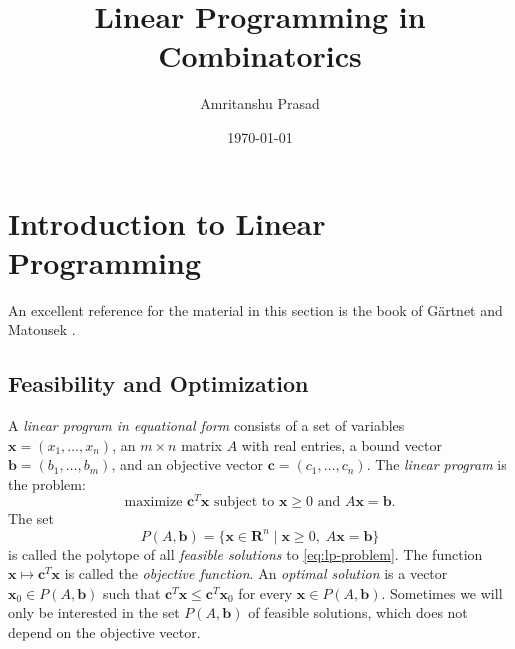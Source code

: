 \documentclass{amsbook}
\newcommand{\xx}{\mathbf x}
\newcommand{\cc}{\mathbf c}
\newcommand{\bb}{\mathbf b}
\newcommand{\RR}{\mathbf R}
\theoremstyle{definition}
\theoremstyle{remark}
\begin{document}
\title{Linear Programming in Combinatorics}
\author{Amritanshu Prasad}
\address{The Institute of Mathematical Sciences, Chennai.}
\address{Homi Bhabha National Institute, Mumbai.}
\date{\today}
\maketitle
\chapter{Introduction to Linear Programming}
\label{cha:intro-lp}
An excellent reference for the material in this section is the book of G\"artnet and Matousek \cite{GM}.
\section{Feasibility and Optimization}
\label{sec:feas-opt}
A \emph{linear program in equational form} consists of a set of variables $\xx=(x_1,\dotsc,x_n)$, an $m\times n$ matrix $A$ with real entries, a bound vector $\bb=(b_1,\dotsc,b_m)$, and an objective vector $\cc = (c_1,\dotsc,c_n)$.
The \emph{linear program} is the problem:
\begin{equation}
  \tag{LP}
  \label{eq:lp-problem}
  \text{maximize $\cc^T\xx$ subject to $\xx\geq 0$ and $A\xx=\bb$}.
\end{equation}
The set
\begin{displaymath}
  P(A,\bb) = \{\xx\in \RR^n\mid \xx\geq 0,\;A\xx=\bb\}
\end{displaymath}
is called the polytope of all \emph{feasible solutions} to \eqref{eq:lp-problem}.
The function $\xx\mapsto \cc^T\xx$ is called the \emph{objective function}.
An \emph{optimal solution} is a vector $\xx_0\in P(A,\bb)$ such that $\cc^T\xx\leq \cc^T\xx_0$ for every $\xx\in P(A,\bb)$.
Sometimes we will only be interested in the set $P(A,\bb)$ of feasible solutions, which does not depend on the objective vector.
\end{document}
